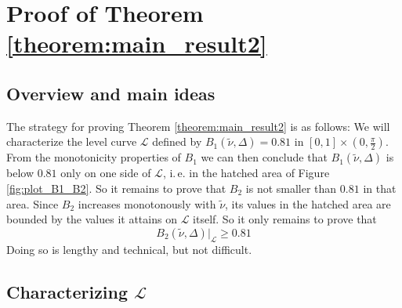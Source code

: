\documentclass{article}
\newcommand{\ite}{i.\,e.\xspace}
\begin{document}
\section{Proof of Theorem \ref{theorem:main_result2}}  \label{sec:Proof2}

\subsection{Overview and main ideas}

The strategy for proving Theorem \ref{theorem:main_result2} is as follows: We will characterize the level curve $\mathcal{L}$ defined by $B_1(\tilde\nu,\Delta) = 0.81$ in $[0,1]\times(0,\frac\pi 2)$. From the monotonicity properties of $B_1$ we can then conclude that $B_1(\tilde\nu,\Delta)$ is below $0.81$ only on one side of $\mathcal{L}$, \ite in the hatched area of Figure \ref{fig:plot_B1_B2}. So it remains to prove that $B_2$ is not smaller than $0.81$ in that area. Since $B_2$ increases monotonously with $\tilde\nu$, its values in the hatched area are bounded by the values it attains on $\mathcal{L}$ itself. So it only remains to prove that \[B_2(\tilde\nu,\Delta)|_{\mathcal{L}} \ge 0.81\]
Doing so is lengthy and technical, but not difficult.

\subsection{Characterizing $\mathcal{L}$}
\end{document}
